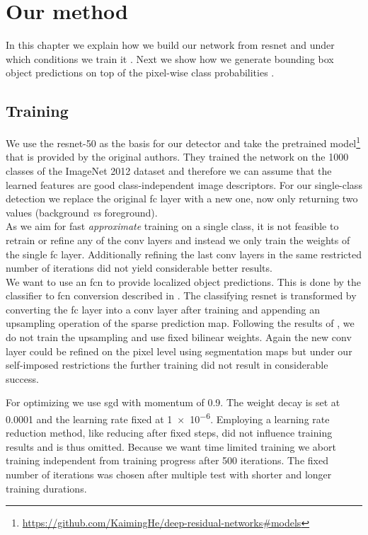 %
\chapter{Our method}
\label{sec:pipeline}
In this chapter we explain how we build our network from \gls{resnet} and under which conditions we train it . Next we show how we generate bounding box object predictions on top of the pixel-wise class probabilities .

\section{Training}
\label{sec:pipeline:training}
We use the \gls{resnet}-50  as the basis for our detector and take the pretrained model\footnote{\url{https://github.com/KaimingHe/deep-residual-networks\#models}} that is provided by the original authors. They trained the network on the 1000 classes of the ImageNet 2012 dataset \citep{russakovsky_imagenet_2015} and therefore we can assume that the learned features are good class-independent image descriptors. For our single-class detection we replace the original \gls{fc} layer with a new one, now only returning two values (background \textit{vs} foreground).\\
As we aim for fast \textit{approximate} training on a single class, it is not feasible to retrain or refine any of the \gls{conv} layers and instead we only train the weights of the single \gls{fc} layer. Additionally refining the last \gls{conv} layers in the same restricted number of iterations did not yield considerable better results.\\
We want to use an \gls{fcn} to provide localized object predictions. This is done by the classifier to \gls{fcn} conversion described in . The classifying \gls{resnet} is transformed by converting the \gls{fc} layer into a \gls{conv} layer after training and appending an upsampling operation of the sparse prediction map. Following the results of \citep{shelhamer_fully_2016}, we do not train the upsampling and use fixed bilinear weights. Again the new \gls{conv} layer could be refined on the pixel level using segmentation maps but under our self-imposed restrictions the further training did not result in considerable success.

For optimizing we use \gls{sgd} with momentum of 0.9. The weight decay is set at 0.0001 and the learning rate fixed at \num{1e-6}. Employing a learning rate reduction method, like reducing after fixed steps, did not influence training results and is thus omitted. Because we want time limited training we abort training independent from training progress after 500 iterations. The fixed number of iterations was chosen after multiple test with shorter and longer training durations.

